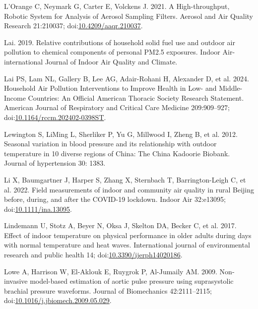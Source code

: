 \documentclass[
  letterpaper,
  DIV=11,
  numbers=noendperiod]{scrartcl}
\newlength{\cslhangindent}
\newlength{\cslentryspacingunit} %
\newenvironment{CSLReferences}[2] %
 {%
  \setlength{\parindent}{0pt}
  \ifodd #1
  \let\oldpar\par
  \def\par{\hangindent=\cslhangindent\oldpar}
  \fi
  \setlength{\parskip}{#2\cslentryspacingunit}
 }%
 {}
\begin{document}
\begin{CSLReferences}{1}{0}
\leavevmode{}%
L'Orange C, Neymark G, Carter E, Volckens J. 2021. A {High-throughput},
{Robotic System} for {Analysis} of {Aerosol Sampling Filters}. Aerosol
and Air Quality Research 21:210037;
doi:\href{https://doi.org/10.4209/aaqr.210037}{10.4209/aaqr.210037}.

\leavevmode{}%
Lai. 2019. Relative contributions of household solid fuel use and
outdoor air pollution to chemical components of personal {PM2}.5
exposures. Indoor Air-international Journal of Indoor Air Quality and
Climate.

\leavevmode{}%
Lai PS, Lam NL, Gallery B, Lee AG, Adair-Rohani H, Alexander D, et al.
2024. Household {Air Pollution Interventions} to {Improve Health} in
{Low-} and {Middle-Income Countries}: {An Official American Thoracic
Society Research Statement}. American Journal of Respiratory and
Critical Care Medicine 209:909--927;
doi:\href{https://doi.org/10.1164/rccm.202402-0398ST}{10.1164/rccm.202402-0398ST}.

\leavevmode{}%
Lewington S, LiMing L, Sherliker P, Yu G, Millwood I, Zheng B, et al.
2012. Seasonal variation in blood pressure and its relationship with
outdoor temperature in 10 diverse regions of {China}: The {China
Kadoorie Biobank}. Journal of hypertension 30: 1383.

\leavevmode{}%
Li X, Baumgartner J, Harper S, Zhang X, Sternbach T, Barrington-Leigh C,
et al. 2022. Field measurements of indoor and community air quality in
rural {Beijing} before, during, and after the {COVID-19} lockdown.
Indoor Air 32:e13095;
doi:\href{https://doi.org/10.1111/ina.13095}{10.1111/ina.13095}.

\leavevmode{}%
Lindemann U, Stotz A, Beyer N, Oksa J, Skelton DA, Becker C, et al.
2017. Effect of indoor temperature on physical performance in older
adults during days with normal temperature and heat waves. International
journal of environmental research and public health 14;
doi:\href{https://doi.org/10.3390/ijerph14020186}{10.3390/ijerph14020186}.

\leavevmode{}%
Lowe A, Harrison W, El-Aklouk E, Ruygrok P, Al-Jumaily AM. 2009.
Non-invasive model-based estimation of aortic pulse pressure using
suprasystolic brachial pressure waveforms. Journal of Biomechanics
42:2111--2115;
doi:\href{https://doi.org/10.1016/j.jbiomech.2009.05.029}{10.1016/j.jbiomech.2009.05.029}.


\end{CSLReferences}
\end{document}

